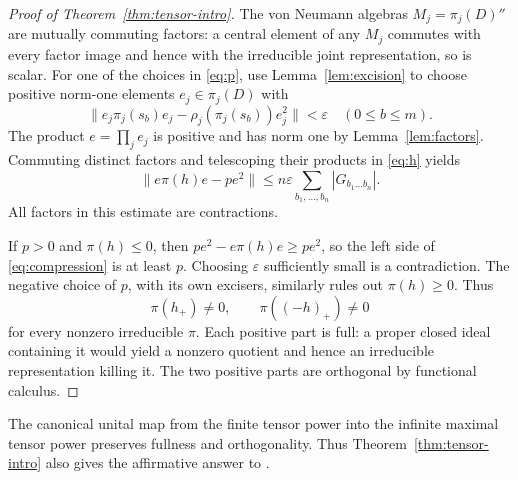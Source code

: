 \begin{proof}[Proof of Theorem~\ref{thm:tensor-intro}]
The von Neumann algebras \(M_j=\pi_j(D)''\) are mutually commuting factors: a central element of any \(M_j\) commutes with every factor image and hence with the irreducible joint representation, so is scalar. For one of the choices in \eqref{eq:p}, use Lemma~\ref{lem:excision} to choose positive norm-one elements \(e_j\in\pi_j(D)\) with
\[
 \|e_j\pi_j(s_b)e_j-\rho_j(\pi_j(s_b))e_j^2\|<\varepsilon
 \quad(0\leq b\leq m).
\]
The product \(e=\prod_j e_j\) is positive and has norm one by Lemma~\ref{lem:factors}. Commuting distinct factors and telescoping their products in \eqref{eq:h} yields
\begin{equation}\label{eq:compression}
 \|e\pi(h)e-pe^2\|
 \leq n\varepsilon\sum_{b_1,\ldots,b_n}|G_{b_1\ldots b_n}|.
\end{equation}
All factors in this estimate are contractions.

If \(p>0\) and \(\pi(h)\leq0\), then \(pe^2-e\pi(h)e\geq pe^2\), so the left side of \eqref{eq:compression} is at least \(p\). Choosing \(\varepsilon\) sufficiently small is a contradiction. The negative choice of \(p\), with its own excisers, similarly rules out \(\pi(h)\geq0\). Thus
\[
 \pi(h_+)\ne0,\qquad\pi((-h)_+)\ne0
\]
for every nonzero irreducible \(\pi\). Each positive part is full: a proper closed ideal containing it would yield a nonzero quotient and hence an irreducible representation killing it. The two positive parts are orthogonal by functional calculus.
\end{proof}

The canonical unital map from the finite tensor power into the infinite maximal tensor power preserves fullness and orthogonality. Thus Theorem~\ref{thm:tensor-intro} also gives the affirmative answer to \cite[Question 6.2]{KR}.

